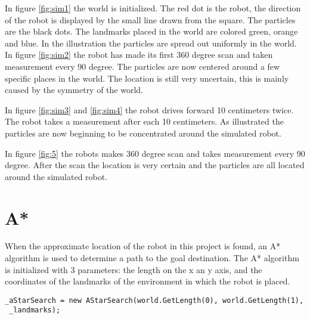 In figure \ref{fig:sim1} the world is initialized. The red dot is the robot, the direction of the robot is displayed by the small line drawn from the square. The particles are the black dots. The landmarks placed in the world are colored green, orange and blue. In the illustration the particles are spread out uniformly in the world. In figure \ref{fig:sim2} the robot has made its first 360 degree scan and taken measurement every 90 degree. The particles are now centered around a few specific places in the world. The location is still very uncertain, this is mainly caused by the symmetry of the world.


In figure \ref{fig:sim3} and \ref{fig:sim4} the robot drives forward 10 centimeters twice. The robot takes a measurement after each 10 centimeters. As illustrated the particles are now beginning to be concentrated around the simulated robot.


\FloatBarrier
In figure \ref{fig:5} the robots makes 360 degree scan and takes measurement every 90 degree. After the scan the location is very certain and the particles are all located around the simulated robot.


\section{A*}
When the approximate location of the robot in this project is found, an A* algorithm is used to determine a path to the goal destination. The A* algorithm is initialized with 3 parameters: the length on the x an y axis, and the coordinates of the landmarks of the environment in which the robot is placed. 

\lstset{style=sharpc}
\begin{lstlisting}[caption={Initialization of the A* algorithm}, label=lst:Astar_init, mathescape=true]             
_aStarSearch = new AStarSearch(world.GetLength(0), world.GetLength(1),
 _landmarks);
\end{lstlisting}


